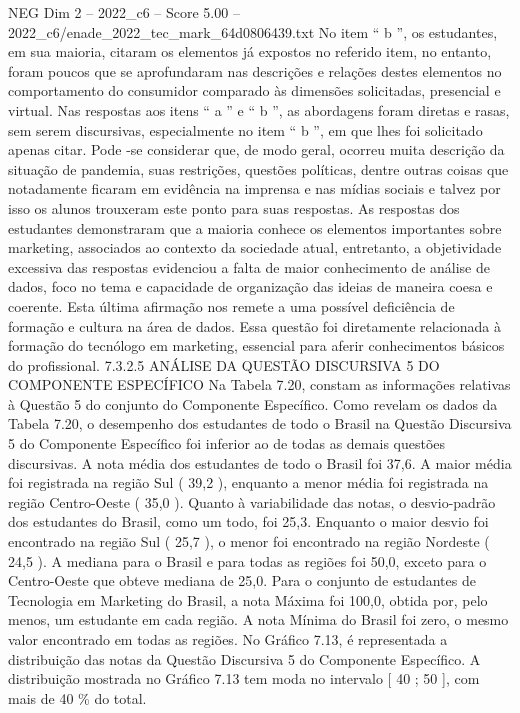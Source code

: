 \begin{textsample}{NEG Dim 2 – 2022\_c6 – Score 5.00 – 2022\_c6/enade\_2022\_tec\_mark\_64d0806439.txt}
No item “ b ”, os estudantes, em sua maioria, citaram os elementos já expostos no referido item, no entanto, foram poucos que se aprofundaram nas descrições e relações destes elementos no comportamento do consumidor comparado às dimensões solicitadas, presencial e virtual.
Nas respostas aos itens “ a ” e “ b ”, as abordagens foram diretas e rasas, sem serem discursivas, especialmente no item “ b ”, em que lhes foi solicitado apenas citar.
Pode -se considerar que, de modo geral, ocorreu muita descrição da situação de pandemia, suas restrições, questões políticas, dentre outras coisas que notadamente ficaram em evidência na imprensa e nas mídias sociais e talvez por isso os alunos trouxeram este ponto para suas respostas.
As respostas dos estudantes demonstraram que a maioria conhece os elementos importantes sobre marketing, associados ao contexto da sociedade atual, entretanto, a objetividade excessiva das respostas evidenciou a falta de maior conhecimento de análise de dados, foco no tema e capacidade de organização das ideias de maneira coesa e coerente.
Esta última afirmação nos remete a uma possível deficiência de formação e cultura na área de dados.
Essa questão foi diretamente relacionada à formação do tecnólogo em marketing, essencial para aferir conhecimentos básicos do profissional. 7.3.2.5 ANÁLISE DA QUESTÃO DISCURSIVA 5 DO COMPONENTE ESPECÍFICO Na Tabela 7.20, constam as informações relativas à Questão 5 do conjunto do Componente Específico.
Como revelam os dados da Tabela 7.20, o desempenho dos estudantes de todo o Brasil na Questão Discursiva 5 do Componente Específico foi inferior ao de todas as demais questões discursivas.
A nota média dos estudantes de todo o Brasil foi 37,6.
A maior média foi registrada na região Sul ( 39,2 ), enquanto a menor média foi registrada na região Centro-Oeste ( 35,0 ).
Quanto à variabilidade das notas, o desvio-padrão dos estudantes do Brasil, como um todo, foi 25,3.
Enquanto o maior desvio foi encontrado na região Sul ( 25,7 ), o menor foi encontrado na região Nordeste ( 24,5 ).
A mediana para o Brasil e para todas as regiões foi 50,0, exceto para o Centro-Oeste que obteve mediana de 25,0.
Para o conjunto de estudantes de Tecnologia em Marketing do Brasil, a nota Máxima foi 100,0, obtida por, pelo menos, um estudante em cada região.
A nota Mínima do Brasil foi zero, o mesmo valor encontrado em todas as regiões.
No Gráfico 7.13, é representada a distribuição das notas da Questão Discursiva 5 do Componente Específico.
A distribuição mostrada no Gráfico 7.13 tem moda no intervalo [ 40 ; 50 ], com mais de 40 \% do total.

\end{textsample}
